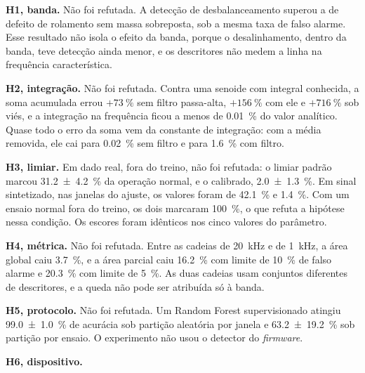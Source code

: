 \textbf{H1, banda.} Não foi refutada. A detecção de desbalanceamento superou a de defeito de
        rolamento sem massa sobreposta, sob a mesma taxa de falso alarme. Esse resultado não
        isola o efeito da banda, porque o desalinhamento, dentro da banda, teve detecção ainda
        menor, e os descritores não medem a linha na frequência característica.

\textbf{H2, integração.} Não foi refutada. Contra uma senoide com integral conhecida, a soma
        acumulada errou $+\SI{73}{\percent}$ sem filtro passa-alta, $+\SI{156}{\percent}$ com ele
        e $+\SI{716}{\percent}$ sob viés, e a integração na frequência ficou a menos de
        \SI{0,01}{\percent} do valor analítico. Quase todo o erro da soma vem da constante de
        integração: com a média removida, ele cai para \SI{0,02}{\percent} sem filtro e para
        \SI{1,6}{\percent} com filtro.

\textbf{H3, limiar.} Em dado real, fora do treino, não foi refutada: o limiar padrão marcou
        \SI{31,2 \pm 4,2}{\percent} da operação normal, e o calibrado, \SI{2,0 \pm 1,3}{\percent}.
        Em sinal sintetizado, nas janelas do ajuste, os valores foram de \SI{42,1}{\percent} e
        \SI{1,4}{\percent}. Com um ensaio normal fora do treino, os dois marcaram
        \SI{100}{\percent}, o que refuta a hipótese nessa condição. Os escores foram idênticos nos
        cinco valores do parâmetro.

\textbf{H4, métrica.} Não foi refutada. Entre as cadeias de \SI{20}{\kilo\hertz} e de
        \SI{1}{\kilo\hertz}, a área global caiu \SI{3,7}{\percent}, e a área parcial caiu
        \SI{16,2}{\percent} com limite de \SI{10}{\percent} de falso alarme e \SI{20,3}{\percent}
        com limite de \SI{5}{\percent}. As duas cadeias usam conjuntos diferentes de descritores,
        e a queda não pode ser atribuída só à banda.

\textbf{H5, protocolo.} Não foi refutada. Um Random Forest supervisionado atingiu
        \SI{99,0 \pm 1,0}{\percent} de acurácia sob partição aleatória por janela e
        \SI{63,2 \pm 19,2}{\percent} sob partição por ensaio. O experimento não usou o detector do
        \emph{firmware}.

\textbf{H6, dispositivo.} 


